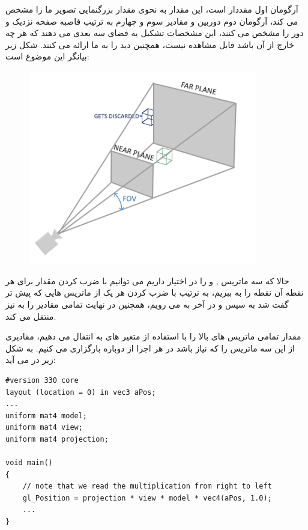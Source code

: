 \documentclass[a4paper, 12pt]{book}
\newcommand{\lrit}[1]{\lr{\textit{#1}}}
\begin{document}
    آرگومان اول مقددار  است، این مقدار به نحوی مقدار بزرگنمایی تصویر ما را مشخص می کند، آرگومان دوم  دوربین و مقادیر سوم و چهارم به ترتیب فاصبه صفحه نزدیک و دور را مشخص می کنند، این مشخصات تشکیل یه فضای سه بعدی می دهند که هر چه خارج از آن باشد قابل مشاهده نیست، همچنین دید  را به ما ارائه می کنند.
    شکل زیر بیانگر این موضوع است:

\begin{figure}[ht]
    \centering
    \href{https://learnopengl.com}{
        \includegraphics[width=10cm]{images/perspective_frustum.png}
    }
    \caption{}
    \label{fig:my_label}
\end{figure}

    حالا که سه ماتریس ,  و  را در اختیار داریم می توانیم با ضرب کردن مقدار  برای هر نقطه آن نقطه را به  ببریم، به ترتیب با ضرب کردن هر یک از ماتریس هایی که پیش تر گفت شد به  سپس  و در آخر به  می رویم، همچنین  در نهایت تمامی مقادیر را به  نیز منتقل می کند.\par
    مقدار تمامی ماتریس های بالا را با استفاده از متغیر های  به  انتفال می دهیم، مقادیری از این سه ماتریس را که نیاز باشد در هر اجرا از  دوباره بارگزاری می کنیم. به شکل زیر در می آید:
    \newpage
    \begin{LTR}
    \small
        \begin{lstlisting}[style=C++Style,caption=\lrit{going 3D}]
#version 330 core
layout (location = 0) in vec3 aPos;
...
uniform mat4 model;
uniform mat4 view;
uniform mat4 projection;

void main()
{
    // note that we read the multiplication from right to left
    gl_Position = projection * view * model * vec4(aPos, 1.0);
    ...
}
        \end{lstlisting}
    \end{LTR}
    \normalsize
    \vspace*{0.3cm}
    
\end{document}
